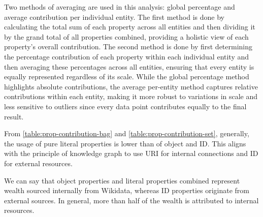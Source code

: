 Two methods of averaging are used in this analysis: global percentage and average contribution per individual entity. The first method is done by calculating the total sum of each property across all entities and then dividing it by the grand total of all properties combined, providing a holistic view of each property's overall contribution. The second method is done by first determining the percentage contribution of each property within each individual entity and then averaging these percentages across all entities, ensuring that every entity is equally represented regardless of its scale. While the global percentage method highlights absolute contributions, the average per-entity method captures relative contributions within each entity, making it more robust to variations in scale and less sensitive to outliers since every data point contributes equally to the final result.

From \autoref{table:prop-contribution-bag} and \autoref{table:prop-contribution-set}, generally, the usage of pure literal properties is lower than of object and ID. This aligns with the principle of knowledge graph to use URI for internal connections and ID for external resources.

We can say that object properties and literal properties combined represent wealth sourced internally from Wikidata, whereas ID properties originate from external sources. In general, more than half of the wealth is attributed to internal resources.

